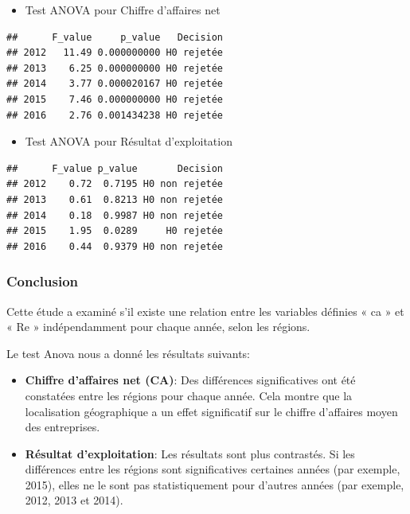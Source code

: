 \documentclass[mstat,12pt]{unswthesis}
\begin{document}
\medskip

\begin{itemize}
\tightlist
\item
  Test ANOVA pour Chiffre d'affaires net
\end{itemize}

\medskip

\begin{verbatim}
##      F_value     p_value   Decision
## 2012   11.49 0.000000000 H0 rejetée
## 2013    6.25 0.000000000 H0 rejetée
## 2014    3.77 0.000020167 H0 rejetée
## 2015    7.46 0.000000000 H0 rejetée
## 2016    2.76 0.001434238 H0 rejetée
\end{verbatim}

\bigskip

\begin{itemize}
\tightlist
\item
  Test ANOVA pour Résultat d'exploitation \medskip
\end{itemize}

\begin{verbatim}
##      F_value p_value       Decision
## 2012    0.72  0.7195 H0 non rejetée
## 2013    0.61  0.8213 H0 non rejetée
## 2014    0.18  0.9987 H0 non rejetée
## 2015    1.95  0.0289     H0 rejetée
## 2016    0.44  0.9379 H0 non rejetée
\end{verbatim}

\subsubsection{Conclusion}\label{conclusion-2}

Cette étude a examiné s'il existe une relation entre les variables
définies « ca » et « Re » indépendamment pour chaque année, selon les
régions.

Le test Anova nous a donné les résultats suivants:

\begin{itemize}
\tightlist
\item
  \textbf{Chiffre d'affaires net (CA)}: Des différences significatives
  ont été constatées entre les régions pour chaque année. Cela montre
  que la localisation géographique a un effet significatif sur le
  chiffre d'affaires moyen des entreprises.
\end{itemize}

\medskip

\begin{itemize}
\tightlist
\item
  \textbf{Résultat d'exploitation}: Les résultats sont plus contrastés.
  Si les différences entre les régions sont significatives certaines
  années (par exemple, 2015), elles ne le sont pas statistiquement pour
  d'autres années (par exemple, 2012, 2013 et 2014).
\end{itemize}
\end{document}
